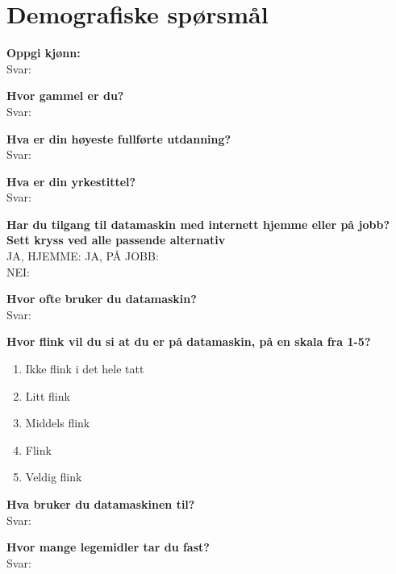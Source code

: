 \chapter{Demografiske spørsmål} \label{chap:demografi}


\textbf{Oppgi kjønn:} \\
Svar: \makebox[7cm]{\hrulefill}

\textbf{Hvor gammel er du?} \\
Svar: \makebox[7cm]{\hrulefill}

\textbf{Hva er din høyeste fullførte utdanning?} \\
Svar: \makebox[7cm]{\hrulefill}

\textbf{Hva er din yrkestittel?}\\
Svar: \makebox[7cm]{\hrulefill}

\textbf{Har du tilgang til datamaskin med internett hjemme eller på jobb?} \\
\textbf{Sett kryss ved alle passende alternativ} \\
JA, HJEMME: \makebox[1cm]{\hrulefill}   JA, PÅ JOBB:\makebox[1cm]{\hrulefill} \\
NEI: \makebox[1cm]{\hrulefill}
	
\textbf{Hvor ofte bruker du datamaskin?} \\
Svar: \makebox[7cm]{\hrulefill}

\pagebreak

\textbf{Hvor flink vil du si at du er på datamaskin, på en skala fra 1-5?}
\begin{enumerate}
\item Ikke flink i det hele tatt
\item Litt flink
\item Middels flink
\item Flink		
\item Veldig flink  
\end{enumerate}

\textbf{Hva bruker du datamaskinen til?}\\
Svar: \makebox[7cm]{\hrulefill}

\textbf{Hvor mange legemidler tar du fast?}\\
Svar: \makebox[7cm]{\hrulefill}

